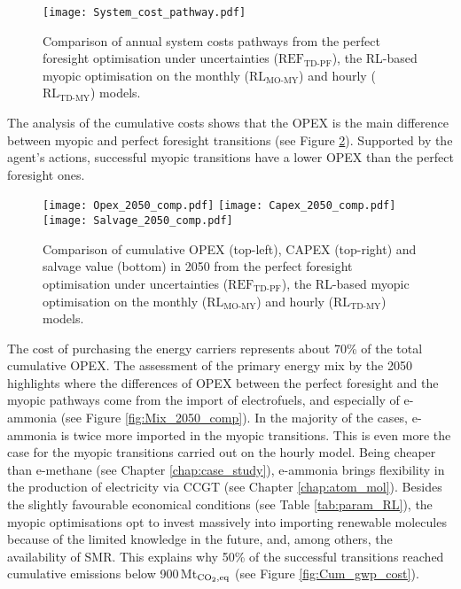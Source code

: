 \begin{figure}[!htbp]
\centering
\texttt{[image: System\_cost\_pathway.pdf]}
\caption{Comparison of annual system costs pathways from the perfect foresight optimisation under uncertainties ($\text{REF}_{\text{TD-PF}}$), the \gls{RL}-based myopic optimisation on the monthly ($\text{RL}_{\text{MO-MY}}$) and hourly ($\text{RL}_{\text{TD-MY}}$) models.}
\label{fig:System_cost_pathway}
\end{figure}

The analysis of the cumulative costs shows that the \gls{OPEX} is the main difference between myopic and perfect foresight transitions (see Figure \ref{fig:Opex_Capex_Salvage_comp}). Supported by the agent's actions, successful myopic transitions have a lower \gls{OPEX} than the perfect foresight ones.

\begin{figure}[!htbp]
\centering
\texttt{[image: Opex\_2050\_comp.pdf]}
\texttt{[image: Capex\_2050\_comp.pdf]}
\texttt{[image: Salvage\_2050\_comp.pdf]}
\caption{Comparison of cumulative OPEX (top-left), CAPEX (top-right) and salvage value (bottom) in 2050 from the perfect foresight optimisation under uncertainties ($\text{REF}_{\text{TD-PF}}$), the \gls{RL}-based myopic optimisation on the monthly ($\text{RL}_{\text{MO-MY}}$) and hourly ($\text{RL}_{\text{TD-MY}}$) models.}
\label{fig:Opex_Capex_Salvage_comp}
\end{figure}

The cost of purchasing the energy carriers represents about 70\% of the total cumulative \gls{OPEX}. The assessment of the primary energy mix by the 2050 highlights where the differences of OPEX between the perfect foresight and the myopic pathways come from the import of electrofuels, and especially of e-ammonia (see Figure \ref{fig:Mix_2050_comp}).  In the majority of the cases, e-ammonia is twice more imported in the myopic transitions. This is even more the case for the myopic transitions carried out on the hourly model. Being cheaper than e-methane (see Chapter \ref{chap:case_study}), e-ammonia brings flexibility in the production of electricity via \gls{CCGT} (see Chapter \ref{chap:atom_mol}). Besides the slightly favourable economical conditions (see Table \ref{tab:param_RL}), the myopic optimisations opt to invest massively into importing renewable molecules because of the limited knowledge in the future, and, among others, the availability of \gls{SMR}. This explains why 50\% of the successful transitions reached cumulative emissions below 900\,Mt$_{\ce{CO2},\text{eq}}$ (see Figure \ref{fig:Cum_gwp_cost}).

